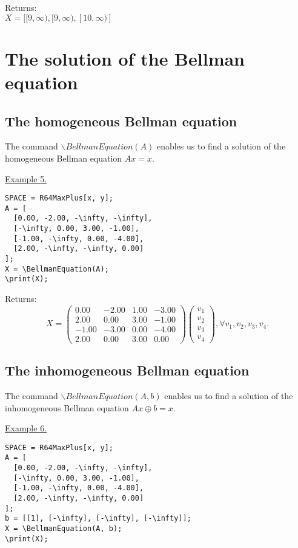 Returns:\\
$X=[[9,\infty),[9,\infty),[10,\infty)]$ 

\section{The solution of the Bellman equation}
\subsection {The homogeneous  Bellman equation}
The command $\backslash BellmanEquation(A)$ enables us to find a solution of the homogeneous  Bellman equation
  $Ax = x$.
\smallskip

\underline{Example 5.}

\vspace*{-3mm}
\begin{verbatim}
SPACE = R64MaxPlus[x, y];
A = [
  [0.00, -2.00, -\infty, -\infty],
  [-\infty, 0.00, 3.00, -1.00],
  [-1.00, -\infty, 0.00, -4.00],
  [2.00, -\infty, -\infty, 0.00]
]; 
X = \BellmanEquation(A); 
\print(X);
\end{verbatim}

Returns:\\
$$
X=\left(\begin{array}{cccc}
0.00 & -2.00 & 1.00 & -3.00\\
2.00 & 0.00 & 3.00 & -1.00\\
-1.00 & -3.00 & 0.00 & -4.00\\
2.00 & 0.00 & 3.00 & 0.00
\end{array}\right) \left(\begin{array}{c}
v_{1}\\
v_{2}\\
v_{3}\\
v_{4}
\end{array}\right), \forall v_{1}, v_{2}, v_{3}, v_{4}.$$
\subsection {The inhomogeneous  Bellman equation}
The command $\backslash BellmanEquation(A,b)$ enables us to find a solution of the inhomogeneous  Bellman equation $Ax\oplus b=x$.
\smallskip

\underline{Example 6. }

\vspace*{-3mm}
\begin{verbatim}
SPACE = R64MaxPlus[x, y];
A = [
  [0.00, -2.00, -\infty, -\infty],
  [-\infty, 0.00, 3.00, -1.00],
  [-1.00, -\infty, 0.00, -4.00],
  [2.00, -\infty, -\infty, 0.00]
];
b = [[1], [-\infty], [-\infty], [-\infty]]; 
X = \BellmanEquation(A, b); 
\print(X);
\end{verbatim}


